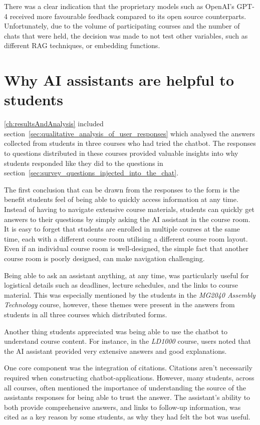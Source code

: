 There was a clear indication that the proprietary models such as OpenAI’s GPT-4 received more favourable feedback compared to its open source counterparts. Unfortunately, due to the volume of participating courses and the number of chats that were held, the decision was made to not test other variables, such as different \gls{RAG} techniques, or embedding functions.


\section{Why AI assistants are helpful to students}


\autoref{ch:resultsAndAnalysis} included section~\ref{sec:qualitative_analysis_of_user_responses} which analysed the answers collected from students in three courses who had tried the chatbot. The responses to questions distributed in these courses provided valuable insights into why students responded like they did to the questions in section~\ref{sec:survey_questions_injected_into_the_chat}.


The first conclusion that can be drawn from the responses to the form is the benefit students feel of being able to quickly access information at any time. Instead of having to navigate extensive course materials, students can quickly get answers to their questions by simply asking the AI assistant in the course room. It is easy to forget that students are enrolled in multiple courses at the same time, each with a different course room utilising a different course room layout. Even if an individual course room is well-designed, the simple fact that another course room is poorly designed, can make navigation challenging.


Being able to ask an assistant anything, at any time, was particularly useful for logistical details such as deadlines, lecture schedules, and the links to course material. This was especially mentioned by the students in the \textit{MG2040 Assembly Technology} course, however, these themes were present in the answers from students in all three courses which distributed forms.


Another thing students appreciated was being able to use the chatbot to understand course content. For instance, in the \textit{LD1000} course, users noted that the AI assistant provided very extensive answers and good explanations.


One core component was the integration of citations. Citations aren’t necessarily required when constructing chatbot-applications. However, many students, across all courses, often mentioned the importance of understanding the source of the assistants responses for being able to trust the answer. The assistant’s ability to both provide comprehensive answers, and links to follow-up information, was cited as a key reason by some students, as why they had felt the bot was useful.


